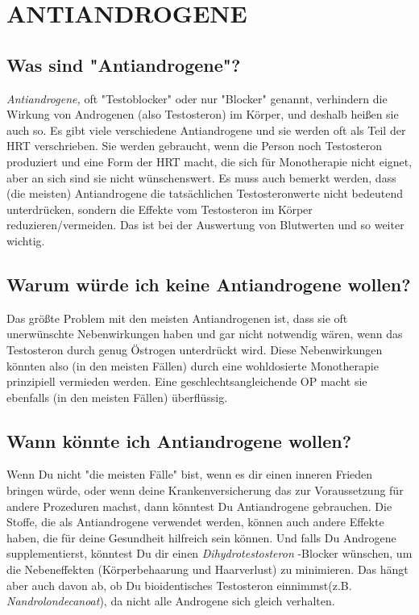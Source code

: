 \documentclass{article}
\begin{document}
{{{ 

\section{ANTIANDROGENE}\label{AA}

\subsection{Was sind "Antiandrogene"?}

\textit{Antiandrogene, }oft "Testoblocker" oder nur "Blocker" genannt, verhindern die Wirkung von Androgenen (also Testosteron) im Körper, und deshalb heißen sie auch so. Es gibt viele verschiedene Antiandrogene und sie werden oft als Teil der HRT verschrieben. Sie werden gebraucht, wenn die Person noch Testosteron produziert und eine Form der HRT macht, die sich für Monotherapie nicht eignet, aber an sich sind sie nicht wünschenswert. Es muss auch bemerkt werden, dass (die meisten) Antiandrogene die tatsächlichen Testosteronwerte nicht bedeutend unterdrücken, sondern die Effekte vom Testosteron im Körper reduzieren/vermeiden. Das ist bei der Auswertung von Blutwerten und so weiter wichtig.

\subsection{Warum würde ich keine Antiandrogene wollen?}

Das größte Problem mit den meisten Antiandrogenen ist, dass sie oft unerwünschte Nebenwirkungen haben und gar nicht notwendig wären, wenn das Testosteron durch genug Östrogen unterdrückt wird. Diese Nebenwirkungen könnten also (in den meisten Fällen) durch eine wohldosierte Monotherapie prinzipiell vermieden werden. Eine geschlechtsangleichende OP macht sie ebenfalls (in den meisten Fällen) überflüssig.

\subsection{Wann könnte ich Antiandrogene wollen?}

Wenn Du nicht "die meisten Fälle" bist, wenn es dir einen inneren Frieden bringen würde, oder wenn deine Krankenversicherung das zur Voraussetzung für andere Prozeduren machst, dann könntest Du Antiandrogene gebrauchen. Die Stoffe, die als Antiandrogene verwendet werden, können auch andere Effekte haben, die für deine Gesundheit hilfreich sein können. Und falls Du Androgene supplementierst, könntest Du dir einen \textit{Dihydrotestosteron }-Blocker wünschen, um die Nebeneffekten (Körperbehaarung und Haarverlust) zu minimieren. Das hängt aber auch davon ab, ob Du bioidentisches Testosteron einnimmst(z.B. \textit{Nandrolondecanoat}), da nicht alle Androgene sich gleich verhalten.

}}}
\end{document}
